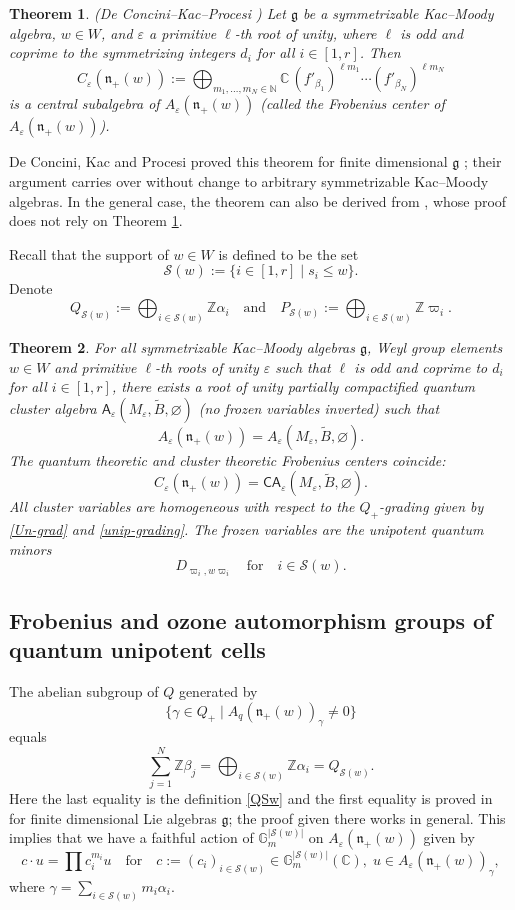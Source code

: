 \documentclass[11pt]{amsart}
\theoremstyle{plain}
\newtheorem{theorem}{Theorem}[section]
\newcommand \bth[1] { \begin{theorem}\label{t#1} }
\renewcommand {\eth} { \end{theorem} }
\newcommand \thref[1]{Theorem \ref{t#1}}
\def \Gset {{\mathbb G}}
\def \Zset {{\mathbb Z}}
\def \Cset {{\mathbb C}}
\def \Nset {{\mathbb N}}
\def \A {{\boldsymbol{\mathsf A}}}
\def \C {{\boldsymbol{\mathsf C}}}
\def \B  {{\widetilde{B}}}
\def \SS {{\mathcal{S}}}
\def \al {\alpha}
\def \be {\beta}
\def \vpi {\varpi}
\def \ga {\gamma}
\def \ep {\varepsilon}
\def \g  {\mathfrak{g}}   %
\def \n  {\mathfrak{n}}
\begin{document}
\bth{DKP-unip} {\em{(De Concini--Kac--Procesi \cite{DKP95})}} Let $\g$ be a symmetrizable Kac--Moody algebra, $w \in W$, and $\ep$ a primitive $\ell$-th root of unity, where $\ell$ is odd and coprime to the symmetrizing integers $d_i$ for all $i \in [1,r]$. Then
\[
C_\ep(\n_+(w)) := \bigoplus_{m_1, \ldots, m_N \in \Nset} \Cset \, (f'_{\be_1})^{\ell m_1} \cdots (f'_{\be_N})^{\ell m_N}
\]
is a central subalgebra of $A_\ep(\n_+(w))$
(called the Frobenius center of $A_\ep(\n_+(w))$).
\eth

De Concini, Kac and Procesi proved this theorem for finite dimensional $\g$ \cite{DKP95}; their argument carries over without change to arbitrary symmetrizable Kac--Moody algebras. In the general case, the theorem can also be derived from \cite[Proposition 4.4 and Theorem 8.5]{NTY2}, whose proof does not rely on \thref{DKP-unip}.

Recall that the support of $w \in W$ is defined to be the set 
\[
\SS(w) := \{ i \in [1,r] \mid s_i \leq w \}.
\]
Denote
\begin{equation}
\label{QSw}
Q_{\SS(w)}:= \bigoplus_{i \in \SS(w)} \Zset \al_i
\quad \mbox{and} \quad 
P_{\SS(w)}:= \bigoplus_{i \in \SS(w)} \Zset \vpi_i.
\end{equation}

\bth{Anw-clust} \cite[Theorems 8.1 and 8.5]{NTY2} For all 
symmetrizable Kac--Moody algebras $\g$, Weyl group elements $w \in W$ and primitive $\ell$-th roots of unity
$\ep$ such that $\ell$ is odd and coprime to $d_i$ for all $i \in [1,r]$, there exists a root of unity partially compactified quantum cluster algebra $\A_\ep(M_\ep, \B, \varnothing)$ (no frozen variables inverted) such that 
\[
A_\ep(\n_+(w)) = A_\ep(M_\ep, \B, \varnothing). 
\]
The quantum theoretic and cluster theoretic Frobenius centers coincide:
\[
C_\ep(\n_+(w)) = \C\A_\ep(M_\ep, \B, \varnothing).
\]
All cluster variables are homogeneous with respect to the $Q_+$-grading given by \eqref{Un-grad} and \eqref{unip-grading}. The frozen variables are the unipotent quantum minors 
\[
D_{\vpi_i, w \vpi_i} 
\quad \mbox{for} \quad 
i \in \SS(w).
\]
\eth
\subsection{Frobenius and ozone automorphism groups of quantum unipotent cells}
The abelian subgroup of $Q$ generated by 
\[
\{ \ga \in Q_+ \mid A_q(\n_+(w))_\gamma \neq 0 \} 
\]
equals 
\begin{equation}
\label{nonzer}
\sum_{j =1}^N \Zset \beta_j = \bigoplus_{i \in \SS(w)} \Zset \al_i = Q_{\SS(w)}.
\end{equation}
Here the last equality is the definition \eqref{QSw} and the first equality is proved in \cite[Lemma 3.2(ii)]{Y-spec} for finite dimensional Lie algebras $\g$; the proof given there works in general. 
This implies that we have a faithful action of $\Gset_m^{|\SS(w)|}$ on 
$A_\ep(\n_+(w))$ given by 
\begin{equation}
\label{t-act-Anw}
c \cdot u = \prod c_i^{m_i} u 
\quad \mbox{for} \quad 
c := (c_i)_{i \in \SS(w)} \in \Gset_m^{|\SS(w)|}(\Cset), \; 
u \in A_\ep(\n_+(w))_\gamma,
\end{equation}
where $\gamma = \sum_{i \in \SS(w)} m_i \alpha_i$. 
\end{document}
